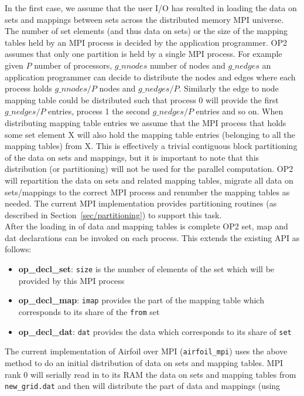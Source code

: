 \documentclass[12pt]{article}
\begin{document}
In the first case, we assume that the user I/O has resulted in loading the data on sets and mappings between
sets across the distributed memory MPI universe. The number of set elements (and thus data on sets) or the size of the
mapping tables held by an MPI process is decided by the application programmer. OP2 assumes that only one partition
is held by a single MPI process. For example given $P$ number of processors, $g\_nnodes$ number of nodes and $g\_nedges$
an application programmer can decide to distribute the nodes and edges where each process holds $g\_nnodes/P$ nodes and
$g\_nedges/P$. Similarly the edge to node mapping table could be distributed such that process 0 will provide the first
$g\_nedges/P$ entries, process 1 the second $g\_nedges/P$ entries and so on. When distributing mapping table entries we
assume that the MPI process that holds some set element X will also hold the mapping table entries (belonging to all
the mapping tables) from X. This is effectively a trivial contiguous block partitioning of the data on sets and
mappings, but it is important to note that this distribution (or partitioning) will not be used for the parallel
computation. OP2 will repartition the data on sets and related mapping tables, migrate all data on sets/mappings to the
correct MPI process and renumber the mapping tables as needed. The current MPI implementation provides partitioning
routines (as described in Section~\ref{sec/partitioning}) to support this task.\\
\indent After the loading in of data and mapping tables is complete OP2 set, map and dat declarations can be invoked on
each process. This extends the existing API as follows:
\begin{itemize}
\item {\bf op\_decl\_set}: {\tt size} is the number of elements of the set which
will be provided by this MPI process

\item {\bf op\_decl\_map}: {\tt imap} provides the part of the mapping table 
which corresponds to its share of the {\tt from} set

\item {\bf op\_decl\_dat}: {\tt dat} provides the data which corresponds to its 
share of {\tt set}
\end{itemize}
\noindent The current implementation of Airfoil over MPI (\texttt{airfoil\_mpi}) uses the above method to do an initial
distribution of data on sets and mapping tables. MPI rank 0 will  serially read in to its RAM the data on sets
and mapping tables from \texttt{new\_grid.dat} and then will distribute the part of data and mappings (using 
\end{document}
